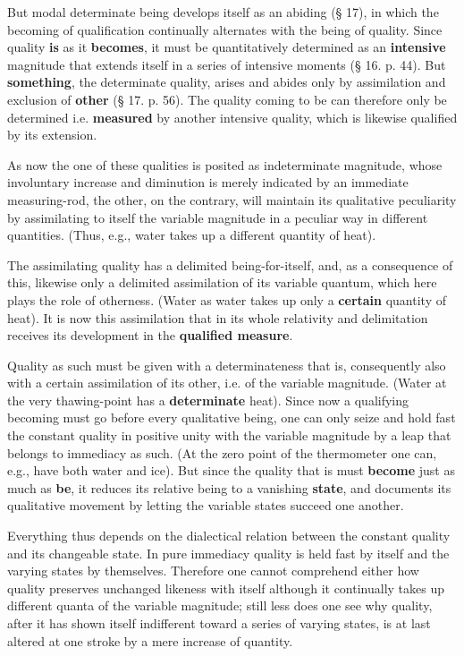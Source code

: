 \documentclass[12pt,a4paper,openany]{book}
\newcommand{\opage}[1]{\marginnote{\footnotesize\textit{[#1]}}}
\begin{document}
But modal determinate being develops itself as an abiding (§ 17), in which the becoming of qualification continually alternates with the being of quality. Since quality \textbf{is} as it \textbf{becomes}, it must be quantitatively determined as an \textbf{intensive} magnitude that extends itself in a series of intensive moments (§ 16. p. 44). But \textbf{something}, the determinate quality, arises and abides only by assimilation and exclusion of \textbf{other} (§ 17. p. 56). The quality coming to be can therefore only be determined
\setcounter{footnote}{0}%
\opage{62}i.e. \textbf{measured} by another intensive quality, which is likewise qualified by its extension.

As now the one of these qualities is posited as indeterminate magnitude, whose involuntary increase and diminution is merely indicated by an immediate measuring-rod, the other, on the contrary, will maintain its qualitative peculiarity by assimilating to itself the variable magnitude in a peculiar way in different quantities. (Thus, e.g., water takes up a different quantity of heat).

The assimilating quality has a delimited being-for-itself, and, as a consequence of this, likewise only a delimited assimilation of its variable quantum, which here plays the role of otherness. (Water as water takes up only a \textbf{certain} quantity of heat). It is now this assimilation that in its whole relativity and delimitation receives its development in the \textbf{qualified measure}.

Quality as such must be given with a determinateness that is, consequently also with a certain assimilation of its other, i.e. of the variable magnitude. (Water at the very thawing-point has a \textbf{determinate} heat). Since now a qualifying becoming must go before every qualitative being, one can only seize and hold fast the constant quality in positive unity with the variable magnitude by a leap that belongs to immediacy as such. (At the zero point of the thermometer one can, e.g., have both water and ice). But since the quality that is must \textbf{become} just as much as \textbf{be}, it reduces its relative being to a vanishing \textbf{state}, and documents its qualitative movement by letting the variable states succeed one another.

Everything thus depends on the dialectical relation between the constant quality and its changeable
\setcounter{footnote}{0}%
\opage{63}state. In pure immediacy quality is held fast by itself and the varying states by themselves. Therefore one cannot comprehend either how quality preserves unchanged likeness with itself although it continually takes up different quanta of the variable magnitude; still less does one see why quality, after it has shown itself indifferent toward a series of varying states, is at last altered at one stroke by a mere increase of quantity.
\end{document}
